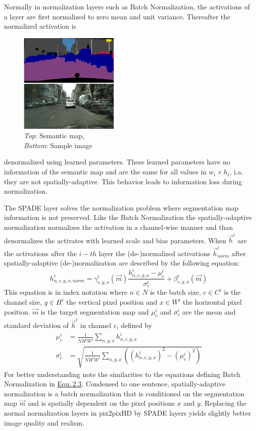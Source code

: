Normally in normalization layers such as Batch Normalization, the activations of a layer are first normalized to zero mean and unit variance. Thereafter the normalized activation is 
%
\begin{figure}
    \begin{center}
        \includegraphics[width=0.43\textwidth]{Chapters/figures/spade_example.PNG}
    \end{center}
    \caption[]{\textit{Top}: Semantic map, \\\textit{Bottom}: Sample image}
\end{figure}
%
denormalized using learned parameters. These learned parameters have no information of the semantic map and are the same for all values in $w_i\times h_i$, i.a. they are not spatially-adaptive. This behavior leads to information loss during normalization.

The SPADE layer solves the normalization problem where segmentation map information is not preserved. Like the Batch Normalization the spatially-adaptive normalization normalizes the activation in a channel-wise manner and than denormalizes the activates with learned scale and bias parameters. When $\vec{h}^i$ are the activations after the $i-th$ layer the (de-)normalized activations $\vec{h}_{norm}^i$ after spatially-adaptive (de-)normalization are described by the following equation:
%
\begin{equation}
    h_{n,c,y,x,norm}^i=\gamma_{c,y,x}^i(\vec{m})\frac{h_{n,c,y,x}^i-\mu_c^i}{\sigma_c^i}+\beta_{c,y,x}^i(\vec{m})
\end{equation}
%
This equation is in index notation where $n\in N$ is the batch size, $c\in C^i$ is the channel size, $y\in H^i$ the vertical pixel position and $x\in W^i$ the horizontal pixel position. $\vec{m}$ is the target segmentation map and $\mu_c^i$ and $\sigma_c^i$ are the mean and standard deviation of $\vec{h}^i$ in channel $c$, defined by 
%
\begin{align}
    \mu_c^i&=\frac{1}{NH^iW^i}\sum_{n,y,x}h_{n,c,y,x}^i\\[1ex]
    \sigma_c^i&=\sqrt{\frac{1}{NH^iW^i}\sum_{n,y,x}\left((h_{n,c,y,x}^i)^2-(\mu_c^i)^2\right)}
\end{align}
%
For better understanding note the similarities to the equations defining Batch Normalization in \hyperref[equ:2.3]{Equ.\,2.3}. Condensed to one sentence, spatially-adaptive normalization is a batch normalization that is conditioned on the segmentation map $\vec{m}$ and is spatially dependent on the pixel positions $x$ and $y$. Replacing the normal normalization layers in pix2pixHD by SPADE layers yields slightly better image quality and realism.